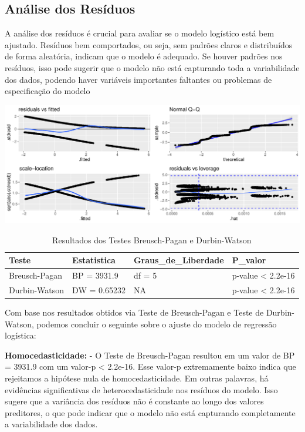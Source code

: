 \documentclass[
  letterpaper,
  DIV=11,
  numbers=noendperiod]{scrreprt}
\begin{document}
\subsection{Análise dos Resíduos}\label{anuxe1lise-dos-resuxedduos-2}

A análise dos resíduos é crucial para avaliar se o modelo logístico está
bem ajustado. Resíduos bem comportados, ou seja, sem padrões claros e
distribuídos de forma aleatória, indicam que o modelo é adequado. Se
houver padrões nos resíduos, isso pode sugerir que o modelo não está
capturando toda a variabilidade dos dados, podendo haver variáveis
importantes faltantes ou problemas de especificação do modelo

\includegraphics{trabalho_files/figure-pdf/unnamed-chunk-38-1.pdf}

\begin{longtable}[t]{llll}
\caption{\label{tab:unnamed-chunk-40}Resultados dos Testes Breusch-Pagan e Durbin-Watson}\\
\toprule
Teste & Estatistica & Graus\_de\_Liberdade & P\_valor\\
\midrule
Breusch-Pagan & BP = 3931.9 & df = 5 & p-value < 2.2e-16\\
Durbin-Watson & DW = 0.65232 & NA & p-value < 2.2e-16\\
\bottomrule
\end{longtable}

Com base nos resultados obtidos via Teste de Breusch-Pagan e Teste de
Durbin-Watson, podemos concluir o seguinte sobre o ajuste do modelo de
regressão logística:

\textbf{Homocedasticidade:} - O Teste de Breusch-Pagan resultou em um
valor de BP = 3931.9 com um valor-p \textless{} 2.2e-16. Esse valor-p
extremamente baixo indica que rejeitamos a hipótese nula de
homocedasticidade. Em outras palavras, há evidências significativas de
heterocedasticidade nos resíduos do modelo. Isso sugere que a variância
dos resíduos não é constante ao longo dos valores preditores, o que pode
indicar que o modelo não está capturando completamente a variabilidade
dos dados.
\end{document}
